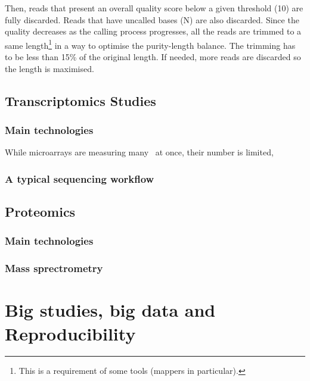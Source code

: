Then, reads that present an overall quality score below a given threshold (10) are
fully discarded. Reads that have uncalled bases (\textsc{N}) are also discarded.
Since the quality decreases as the calling process progresses, all the reads are
trimmed to a same length\footnote{This is a requirement of some tools (mappers
in particular).} in a way to optimise the purity-length balance. The trimming has
to be less than 15\% of the original length. If needed, more reads are discarded
so the length is maximised.








\subsection{Transcriptomics Studies}
    \subsubsection{Main technologies}
While microarrays are measuring many \mRNAs\ at once, their number is limited,
    \subsubsection{A typical sequencing workflow}
\subsection{Proteomics}
    \subsubsection{Main technologies}
    \subsubsection{Mass sprectrometry}

\section{Big studies, big data and Reproducibility}



